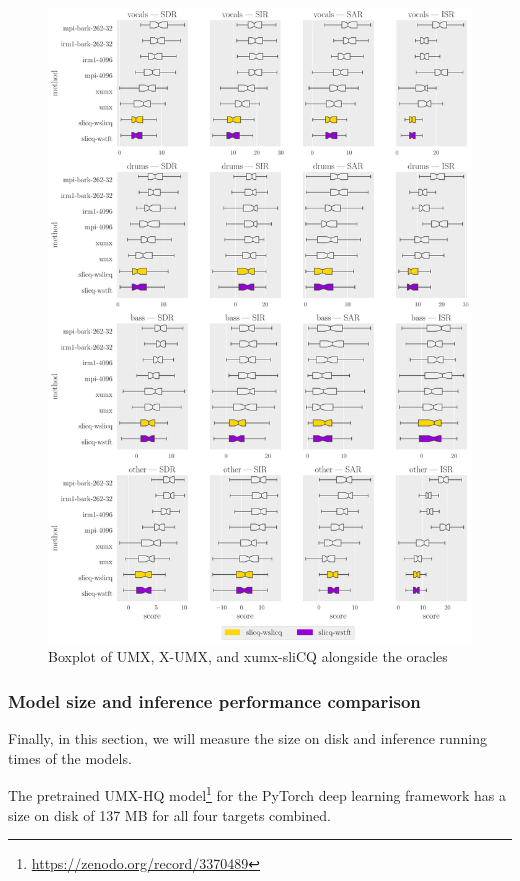 \documentclass[report.tex]{subfiles}
\begin{document}
\begin{figure}[ht]
	\centering
	\includegraphics[width=\textwidth]{./images-bss/boxplot_full.pdf}
	\caption{Boxplot of UMX, X-UMX, and xumx-sliCQ alongside the oracles}
	\label{fig:bssboxplot}
\end{figure}

\subsubsection{Model size and inference performance comparison}
\label{sec:inferenceperf}

Finally, in this section, we will measure the size on disk and inference running times of the models.

The pretrained UMX-HQ model\footnote{\url{https://zenodo.org/record/3370489}} for the PyTorch deep learning framework has a size on disk of 137 MB for all four targets combined.
\end{document}
